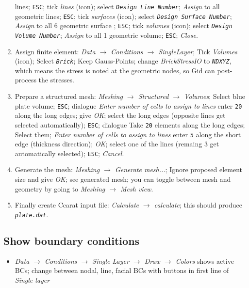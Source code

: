 \begin{enumerate}
lines; \texttt{ESC}; tick \emph{lines} (icon); select \texttt{\emph{Design
Line Number}}; \emph{Assign} to all geometric lines; \texttt{ESC};
tick \emph{surfaces} (icon); select \texttt{\emph{Design Surface Number}};
\emph{Assign} to all 6 geometric surface ; \texttt{ESC}; tick \emph{volumes}
(icon); select \texttt{\emph{Design Volume Number}}; \emph{Assign}
to all 1 geometric volume; \texttt{ESC}; \emph{Close}. 
\item Assign finite element: \emph{Data $\rightarrow$ Conditions $\rightarrow$
SingleLayer}; Tick \emph{Volumes} (icon); Select \texttt{\emph{Brick}};
Keep Gauss-Points; change \emph{BrickStressIO} to \texttt{\emph{NDXYZ}},
which means the stress is noted at the geometric nodes, so Gid can
post-process the stresses. 
\item Prepare a structured mesh: \emph{Meshing $\rightarrow$ Structured
$\rightarrow$ Volumes}; Select blue plate volume; \texttt{ESC}; dialogue
\emph{Enter number of cells to assign to lines} enter \texttt{20}
along the long edges; give \emph{OK}; select the long edges (opposite
lines get selected automatically); \texttt{ESC}; dialogue Take \texttt{20}
elements along the long edges; Select them; \emph{Enter number of
cells to assign to lines} enter \texttt{5} along the short edge (thickness
direction); \emph{OK}; select one of the lines (remaing 3 get automatically
selected); \texttt{ESC}; \emph{Cancel}. 
\item Generate the mesh: \emph{Meshing $\rightarrow$ Generate mesh...};
Ignore proposed element size and give \emph{OK}; see generated mesh;
you can toggle between mesh and geometry by going to \emph{Meshing
$\rightarrow$ Mesh view}. 
\item Finally create Ccarat input file: \emph{Calculate $\rightarrow$ calculate};
this should produce \texttt{\emph{plate.dat}}. 
\end{enumerate}

\subsection{Show boundary conditions}\label{tut_struct:sec:show-bound-cond}

\begin{itemize}
\item \emph{Data $\rightarrow$ Conditions $\rightarrow$ Single Layer $\rightarrow$
Draw $\rightarrow$ Colors} shows active BCs; change between nodal,
line, facial BCs with buttons in first line of \emph{Single layer}
\end{itemize}

